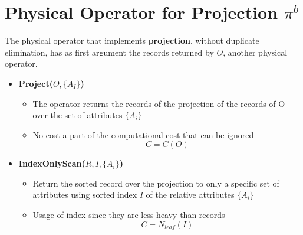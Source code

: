 \section{Physical Operator for Projection $\pi^b$}
The physical operator that implements \textbf{projection}, without duplicate elimination, has as first argument the records returned by $O$, another physical operator.
\begin{itemize}
    \item \textbf{Project($O,\{A_I\}$)}
    \begin{itemize}
        \item The operator returns the records of the projection of the records of O over the set of attributes $\{A_i\}$
        \item No cost a part of the computational cost that can be ignored
        $$C = C(O)$$
    \end{itemize}
    \item \textbf{IndexOnlyScan($R,I,\{A_i\}$)}
    \begin{itemize}
        \item Return the sorted record over the projection to only a specific set of attributes using sorted index $I$ of the relative attributes $\{A_i\}$
        \item Usage of index since they are less heavy than records
        $$C = N_{leaf}(I)$$
    \end{itemize}
\end{itemize}

